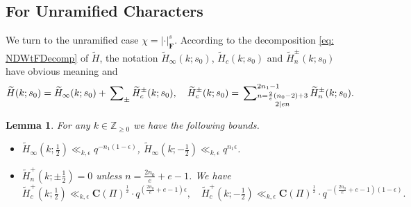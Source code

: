 \documentclass[A4]{amsart}
\def\geq{\geqslant}
\newtheorem{lemma}      [theorem]{Lemma}
\numberwithin{equation}{section} \everymath{\displaystyle}
\newcommand{\Z}{\mathbb{Z}}
\newcommand{\F}{\mathbf{F}}
\newcommand{\norm}[1][\cdot]{\lvert #1 \rvert}
\newcommand{\Cond}{\mathbf{C}}
\begin{document}
	\subsection{For Unramified Characters}

	We turn to the unramified case $\chi = \norm_{\F}^{s}$. According to the decomposition \eqref{eq: NDWtFDecomp} of $\widetilde{H}$, the notation $\widetilde{H}_{\infty}(k; s_0)$, $\widetilde{H}_c(k; s_0)$ and $\widetilde{H}_n^{\pm}(k; s_0)$ have obvious meaning and
	$$ \widetilde{H}(k; s_0) = \widetilde{H}_{\infty}(k; s_0) + \sideset{}{_{\pm}} \sum \widetilde{H}_c^{\pm}(k; s_0), \quad \widetilde{H}_c^{\pm}(k; s_0) = \sideset{}{_{\substack{n=\frac{2}{e}(n_0-2)+3 \\ 2 \mid en}}^{2n_1-1}} \sum \widetilde{H}_n^{\pm}(k; s_0). $$
\begin{lemma} \label{lem: DNDWt+Bd}
	For any $k \in \Z_{\geq 0}$ we have the following bounds.
\begin{itemize}
	\item[(1)] $\widetilde{H}_{\infty}(k; \tfrac{1}{2}) \ll_{k,\epsilon} q^{-n_1(1-\epsilon)}$, $\widetilde{H}_{\infty}(k; -\tfrac{1}{2}) \ll_{k,\epsilon} q^{n_1 \epsilon}$.
	\item[(2)] $\widetilde{H}_n^{+}(k; \pm \tfrac{1}{2}) = 0$ unless $n=\tfrac{2n_0}{e}+e-1$. We have
	$$ \widetilde{H}_c^{+}(k; \tfrac{1}{2}) \ll_{k,\epsilon} \Cond(\Pi)^{\frac{1}{2}} \cdot q^{\left( \frac{2n_0}{e}+e-1 \right) \epsilon}, \quad \widetilde{H}_c^{+}(k; -\tfrac{1}{2}) \ll_{k,\epsilon} \Cond(\Pi)^{\frac{1}{2}} \cdot q^{-\left( \frac{2n_0}{e}+e-1 \right)(1-\epsilon)}. $$
\end{itemize}
\end{lemma}
\end{document}
